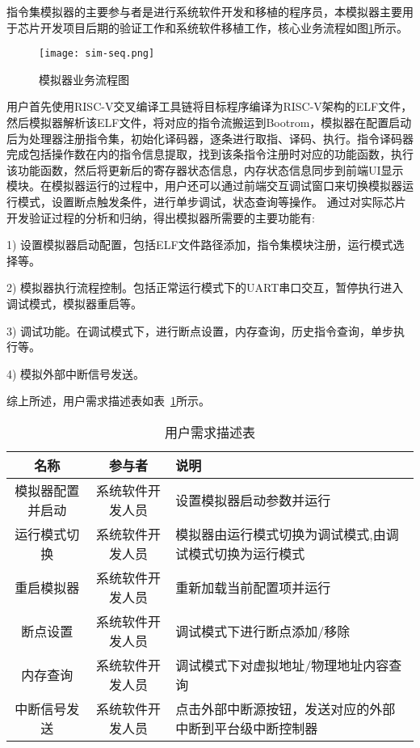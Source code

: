 指令集模拟器的主要参与者是进行系统软件开发和移植的程序员，本模拟器主要用于芯片开发项目后期的验证工作和系统软件移植工作，核心业务流程如图\ref{fig:sim-seq}所示。
\begin{figure}[H]
  \centering
  \texttt{[image: sim-seq.png]}
  \caption{模拟器业务流程图}
  \label{fig:sim-seq}
\end{figure}

用户首先使用RISC-V交叉编译工具链将目标程序编译为RISC-V架构的ELF文件，然后模拟器解析该ELF文件，将对应的指令流搬运到Bootrom，模拟器在配置启动后为处理器注册指令集，初始化译码器，逐条进行取指、译码、执行。指令译码器完成包括操作数在内的指令信息提取，找到该条指令注册时对应的功能函数，执行该功能函数，然后将更新后的寄存器状态信息，内存状态信息同步到前端UI显示模块。在模拟器运行的过程中，用户还可以通过前端交互调试窗口来切换模拟器运行模式，设置断点触发条件，进行单步调试，状态查询等操作。
通过对实际芯片开发验证过程的分析和归纳，得出模拟器所需要的主要功能有:


1) 设置模拟器启动配置，包括ELF文件路径添加，指令集模块注册，运行模式选择等。


2) 模拟器执行流程控制。包括正常运行模式下的UART串口交互，暂停执行进入调试模式，模拟器重启等。


3) 调试功能。在调试模式下，进行断点设置，内存查询，历史指令查询，单步执行等。


4) 模拟外部中断信号发送。


综上所述，用户需求描述表如表~\ref{tab:tab1}所示。
\begin{table}[H]
  \centering
  \caption{用户需求描述表}
  \label{tab:tab1}
  \renewcommand\arraystretch{1.2}
  \begin{tabular}{ccl}
    \toprule
    名称   & 参与者   & 说明   \\
    \midrule
    模拟器配置并启动 & 系统软件开发人员 & \multicolumn{1}{p{6cm}}{设置模拟器启动参数并运行} \\ \hline
    运行模式切换 &	系统软件开发人员	& \multicolumn{1}{m{6cm}}{模拟器由运行模式切换为调试模式,由调试模式切换为运行模式}\\
    \hline
    重启模拟器	& 系统软件开发人员	& \multicolumn{1}{p{6cm}}{重新加载当前配置项并运行}\\
    \hline
    断点设置 &	系统软件开发人员 &	\multicolumn{1}{p{6cm}}{调试模式下进行断点添加/移除}\\
    \hline
    内存查询 &	系统软件开发人员 &	\multicolumn{1}{m{6cm}}{调试模式下对虚拟地址/物理地址内容查询}\\
    \hline
    中断信号发送	& 系统软件开发人员 &	\multicolumn{1}{m{6cm}}{点击外部中断源按钮，发送对应的外部中断到平台级中断控制器}\\
    \bottomrule
  \end{tabular}
\end{table}


